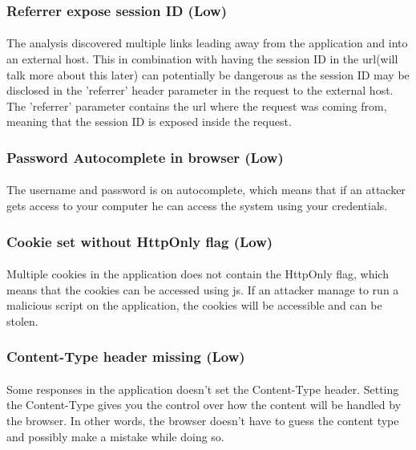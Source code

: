 \documentclass[11pt,english,a4paper]{report}
\begin{document}
\subsubsection{Referrer expose session ID (Low)}
\paragraph{}
The analysis discovered multiple links leading away from the application and into an external host.
This in combination with having the session ID in the \gls{url}(will talk more about this later) can potentially be dangerous as the session ID may be disclosed in the 'referrer' header parameter in the request to the external host.
The 'referrer' parameter contains the \gls{url} where the request was coming from, meaning that the session ID is exposed inside the request.

\subsubsection{Password Autocomplete in browser (Low)}
\paragraph{}
The username and password is on autocomplete, which means that if an attacker gets access to your computer he can access the system using your credentials.

\subsubsection{Cookie set without HttpOnly flag (Low)}
\paragraph{}
Multiple cookies in the application does not contain the HttpOnly flag, which means that the cookies can be accessed using \gls{js}.
If an attacker manage to run a malicious script on the application, the cookies will be accessible and can be stolen.

\subsubsection{Content-Type header missing (Low)}
\paragraph{}
Some responses in the application doesn't set the Content-Type header.
Setting the Content-Type gives you the control over how the content will be handled by the browser.
In other words, the browser doesn't have to guess the content type and possibly make a mistake while doing so.
\end{document}
